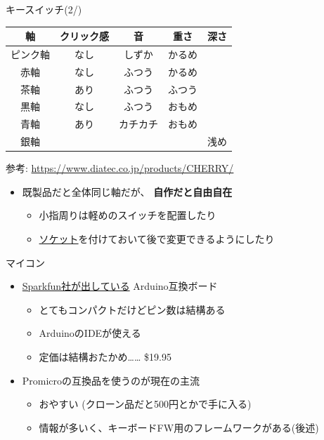 \documentclass[cjk,dvipdfmx,10pt,compress,fragile%
hyperref={bookmarks=true,bookmarksnumbered=true,bookmarksopen=false,%
colorlinks=false,%
pdftitle={第 134 回 関西 Debian 勉強会},%
pdfauthor={小林},%
pdfsubject={資料},%
}]{beamer}
\begin{document}
\begin{frame}[fragile,t]{キースイッチ(2/)}
 \begin{center}
  \begin{tabular}[tb]{c|cccc}
   軸       & クリック感 & 音       & 重さ   & 深さ \\ \hline
   ピンク軸 & なし       & しずか   & かるめ\\
   赤軸     & なし       & ふつう   & かるめ\\
   茶軸     & あり       & ふつう   & ふつう\\
   黒軸     & なし       & ふつう   & おもめ \\
   青軸     & あり       & カチカチ & おもめ \\
   銀軸     &            &          &        & 浅め
  \end{tabular}
 \end{center}
 \begin{flushright}
  参考: \url{https://www.diatec.co.jp/products/CHERRY/}
 \end{flushright}
\begin{itemize}
 \item 既製品だと全体同じ軸だが、 \textbf{自作だと自由自在}
       \begin{itemize}
	\item 小指周りは軽めのスイッチを配置したり
	\item \href{https://yushakobo.jp/shop/a01ps/}{ソケット}を付けておいて後で変更できるようにしたり
       \end{itemize}
\end{itemize}
\end{frame}

\begin{frame}[fragile,t]{マイコン}
 \begin{itemize}
  \item \href{https://www.sparkfun.com/products/12640}{Sparkfun社が出している} Arduino互換ボード
	\begin{itemize}
	 \item とてもコンパクトだけどピン数は結構ある
	 \item ArduinoのIDEが使える
	 \item 定価は結構おたかめ…… \$19.95
	\end{itemize}
  \item Promicroの互換品を使うのが現在の主流
	\begin{itemize}
	 \item おやすい (クローン品だと500円とかで手に入る)
	 \item 情報が多いく、キーボードFW用のフレームワークがある(後述)
	\end{itemize}
 \end{itemize}
\end{frame}
\end{document}
